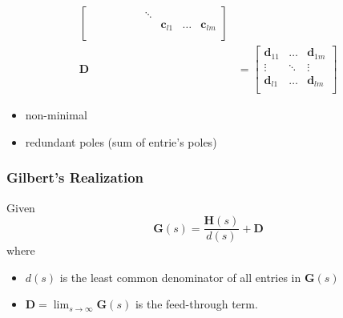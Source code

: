\begin{align*}
\begin{bmatrix}
                       &                 &                 &       &                 &       & \ddots &                 &       &                 \\
                       &                 &                 &       &                 &       &        & \mathbf{c}_{l1} & \dots & \mathbf{c}_{lm} \\
                  \end{bmatrix} \\
    \mathbf{D} & = \begin{bmatrix}
                       \mathbf{d}_{11} & \dots  & \mathbf{d}_{1m} \\
                       \vdots          & \ddots & \vdots          \\
                       \mathbf{d}_{l1} & \dots  & \mathbf{d}_{lm} \\
                   \end{bmatrix}
\end{align*}


\begin{itemize}
    \item non-minimal
    \item redundant poles (sum of entrie's poles)
\end{itemize}

\subsubsection{Gilbert's Realization}

Given
\begin{equation*}
    \mathbf{G}(s)=\frac{\mathbf{H}(s)}{d(s)}+\mathbf{D}
\end{equation*}
where
\begin{itemize}
    \item $d(s)$ is the least common denominator of all entries in $\mathbf{G}(s)$
    \item $\mathbf{D}=\lim_{s\to\infty}\mathbf{G}(s)$ is the feed-through term.
\end{itemize}

